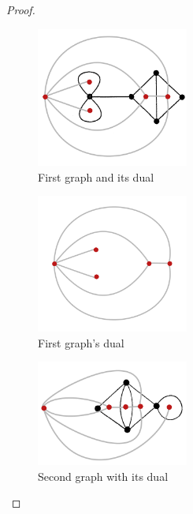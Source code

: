 \begin{proof}$\,$\pn
    \begin{figure}[H]
        \begin{center}
        \includegraphics[width=5cm]{Test2/Problem10/Figure1_4_and_its_dual.png}
        \end{center}                            
        \caption{First graph and its dual}
        \label{t2:p9_Figure1_4_and_its_dual.png}                        
    \end{figure}\pn 
    
    \begin{figure}[H]
        \begin{center}
        \includegraphics[width=5cm]{Test2/Problem10/Figure1_4_dual.png}
        \end{center}                            
        \caption{First graph's dual}
        \label{t2:p9_Figure1_4_dual.png}                        
    \end{figure}\pn       
    
    \begin{figure}[H]
        \begin{center}
        \includegraphics[width=5cm]{Test2/Problem10/Figure1_28_and_its_dual.png}
        \end{center}                            
        \caption{Second graph with its dual}
        \label{t2:p9_Figure1_28_and_its_dual.png}                        
    \end{figure}\pn   
        

\end{proof}
